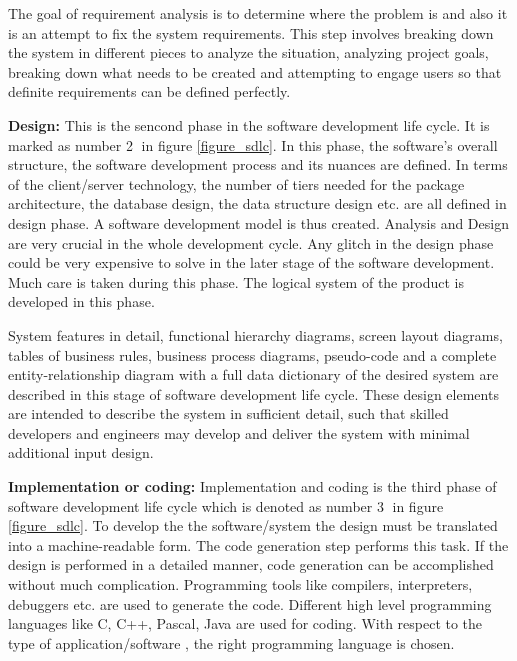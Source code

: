The goal of requirement analysis is to determine where the problem is and also it is an attempt to fix the system requirements. This step involves breaking down the system in different pieces to analyze the situation, analyzing project goals, breaking down what needs to be created and attempting to engage users so that definite requirements can be defined perfectly.

\textbf{Design:}
This is the sencond phase in the software development life cycle. It is marked as number \textcircled{2} in figure \ref{figure_sdlc}. In this phase, the software's overall structure, the software development process and its nuances are defined. In terms of the client/server technology, the number of tiers needed for the package architecture, the database design, the data structure design etc. are all defined in design phase. A software development model is thus created. Analysis and Design are very crucial in the whole development cycle. Any glitch in the design phase could be very expensive to solve in the later stage of the software development. Much care is taken during this phase. The logical system of the product is developed in this phase.

System features in detail, functional hierarchy diagrams, screen layout diagrams, tables of business rules, business process diagrams, pseudo-code and a complete entity-relationship diagram with a full data dictionary of the desired system are described in this stage of software development life cycle. These design elements are intended to describe the system in sufficient detail, such that skilled developers and engineers may develop and deliver the system with minimal additional input design.

\textbf{Implementation or coding:}
Implementation and coding is the third phase of software development life cycle which is denoted as number \textcircled{3} in figure \ref{figure_sdlc}. To develop the the software/system the design must be translated into a machine-readable form. The code generation step performs this task. If the design is performed in a detailed manner, code generation can be accomplished without much complication. Programming tools like compilers, interpreters, debuggers etc. are used to generate the code. Different high level programming languages like C, C++, Pascal, Java are used for coding. With respect to the type of application/software , the right programming language is chosen.

